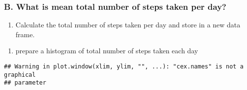 \documentclass[
]{article}
\newenvironment{Shaded}{\begin{snugshade}}{\end{snugshade}}
\newcommand{\DataTypeTok}[1]{\textcolor[rgb]{0.13,0.29,0.53}{#1}}
\newcommand{\DecValTok}[1]{\textcolor[rgb]{0.00,0.00,0.81}{#1}}
\newcommand{\FloatTok}[1]{\textcolor[rgb]{0.00,0.00,0.81}{#1}}
\newcommand{\KeywordTok}[1]{\textcolor[rgb]{0.13,0.29,0.53}{\textbf{#1}}}
\newcommand{\NormalTok}[1]{#1}
\newcommand{\OperatorTok}[1]{\textcolor[rgb]{0.81,0.36,0.00}{\textbf{#1}}}
\newcommand{\StringTok}[1]{\textcolor[rgb]{0.31,0.60,0.02}{#1}}
\providecommand{\tightlist}{%
  \setlength{\itemsep}{0pt}\setlength{\parskip}{0pt}}
\begin{document}
\hypertarget{b.-what-is-mean-total-number-of-steps-taken-per-day}{%
\subsubsection{B. What is mean total number of steps taken per
day?}\label{b.-what-is-mean-total-number-of-steps-taken-per-day}}

\begin{enumerate}
\def\labelenumi{\arabic{enumi}.}
\tightlist
\item
  Calculate the total number of steps taken per day and store in a new
  data frame.
\end{enumerate}

\begin{Shaded}
\end{Shaded}

\begin{enumerate}
\def\labelenumi{\arabic{enumi}.}
\setcounter{enumi}{1}
\tightlist
\item
  prepare a histogram of total number of steps taken each day
\end{enumerate}

\begin{Shaded}
\end{Shaded}

\begin{verbatim}
## Warning in plot.window(xlim, ylim, "", ...): "cex.names" is not a graphical
## parameter
\end{verbatim}
\end{document}
